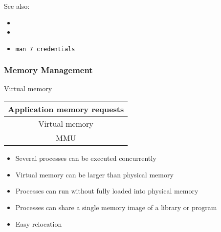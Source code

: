 See also:
\begin{itemize}
\item {}
\item {}
\item \texttt{man 7 credentials}
\end{itemize}

\subsubsection{Memory Management}

\begin{frame}
  \begin{block}{Virtual memory}
    \begin{center}
      \begin{tabular}{|c|}\hline
        Application memory requests\\\hline
        \alert{Virtual memory}\\\hline
        MMU\\\hline
      \end{tabular}
    \end{center}
    \begin{itemize}
    \item Several processes can be executed concurrently
    \item Virtual memory can be larger than physical memory
    \item Processes can run without fully loaded into physical memory
    \item Processes can share a single memory image of a library or program
    \item Easy relocation
    \end{itemize}
  \end{block}
\end{frame}

